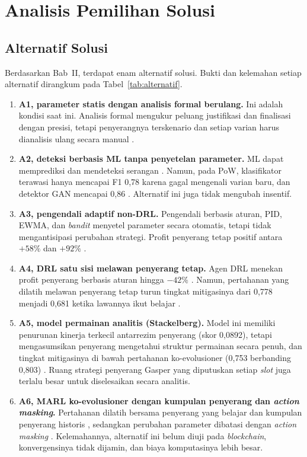 \section{Analisis Pemilihan Solusi}
\label{sec:pemilihan_solusi}

\subsection{Alternatif Solusi}
\label{subsec:alternatif}
Berdasarkan Bab~II, terdapat enam alternatif solusi. Bukti dan kelemahan setiap alternatif dirangkum pada Tabel~\ref{tab:alternatif}.

\begin{enumerate}
	\item \textbf{A1, parameter statis dengan analisis formal berulang.} Ini adalah kondisi saat ini. Analisis formal mengukur peluang justifikasi dan finalisasi dengan presisi, tetapi penyerangnya terskenario dan setiap varian harus dianalisis ulang secara manual \parencite{laneve2025stochastic}.
	\item \textbf{A2, deteksi berbasis ML tanpa penyetelan parameter.} ML dapat memprediksi dan mendeteksi serangan \parencite{rizal2025enhancing}. Namun, pada PoW, klasifikator terawasi hanya mencapai F1 0,78 karena gagal mengenali varian baru, dan detektor GAN mencapai 0,86 \parencite{skowronski2026adaptive}. Alternatif ini juga tidak mengubah insentif.
	\item \textbf{A3, pengendali adaptif non-DRL.} Pengendali berbasis aturan, PID, EWMA, dan \textit{bandit} menyetel parameter secara otomatis, tetapi tidak mengantisipasi perubahan strategi. Profit penyerang tetap positif antara $+58\%$ dan $+92\%$ \parencite{skowronski2026adaptive}.
	\item \textbf{A4, DRL satu sisi melawan penyerang tetap.} Agen DRL menekan profit penyerang berbasis aturan hingga $-42\%$ \parencite{skowronski2026adaptive}. Namun, pertahanan yang dilatih melawan penyerang tetap turun tingkat mitigasinya dari 0,778 menjadi 0,681 ketika lawannya ikut belajar \parencite{wushishi2026coadam}.
	\item \textbf{A5, model permainan analitis (Stackelberg).} Model ini memiliki penurunan kinerja terkecil antarrezim penyerang (skor 0,0892), tetapi mengasumsikan penyerang mengetahui struktur permainan secara penuh, dan tingkat mitigasinya di bawah pertahanan ko-evolusioner (0,753 berbanding 0,803) \parencite{wushishi2026coadam}. Ruang strategi penyerang Gasper yang diputuskan setiap \textit{slot} juga terlalu besar untuk diselesaikan secara analitis.
	\item \textbf{A6, MARL ko-evolusioner dengan kumpulan penyerang dan \textit{action masking}.} Pertahanan dilatih bersama penyerang yang belajar dan kumpulan penyerang historis \parencite{wushishi2026coadam}, sedangkan perubahan parameter dibatasi dengan \textit{action masking} \parencite{skowronski2026adaptive}. Kelemahannya, alternatif ini belum diuji pada \textit{blockchain}, konvergensinya tidak dijamin, dan biaya komputasinya lebih besar.
\end{enumerate}

